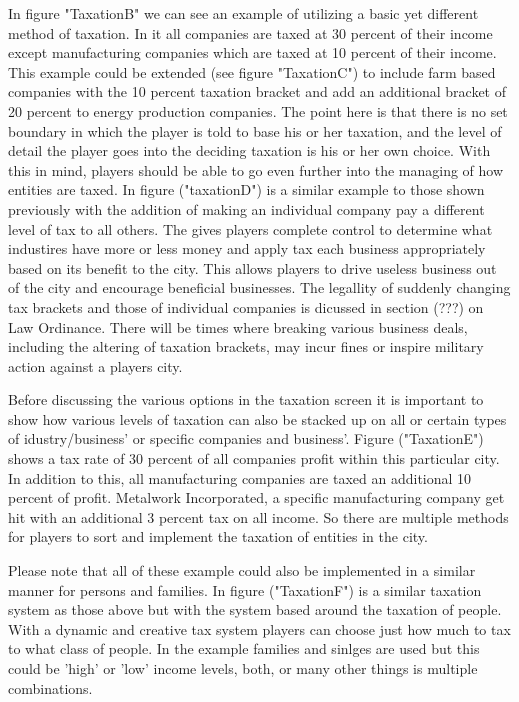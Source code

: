 In figure "TaxationB" we can see an example of utilizing a basic yet different method of taxation. In it all companies are taxed at 30 percent of their income except manufacturing companies which are taxed at 10 percent of their income. This example could be extended (see figure "TaxationC") to include farm based companies with the 10 percent taxation bracket and add an additional bracket of 20 percent to energy production companies. The point here is that there is no set boundary in which the player is told to base his or her taxation, and the level of detail the player goes into the deciding taxation is his or her own choice. With this in mind, players should be able to go even further into the managing of how entities are taxed. 
In figure ("taxationD") is a similar example to those shown previously with the addition of making an individual company pay a different level of tax to all others. The gives players complete control to determine what industires have more or less money and apply tax each business appropriately based on its benefit to the city. This allows players to drive useless business out of the city and encourage beneficial businesses. The legallity of suddenly changing tax brackets and those of individual companies is dicussed in section (???) on Law Ordinance. There will be times where breaking various business deals, including the altering of taxation brackets, may incur fines or inspire military action against a players city.

Before discussing the various options in the taxation screen it is important to show how various levels of taxation can also be stacked up on all or certain types of idustry/business' or specific companies and business'.
Figure ("TaxationE") shows a tax rate of 30 percent of all companies profit within this particular city. In addition to this, all manufacturing companies are taxed an additional 10 percent of profit. Metalwork Incorporated, a specific manufacturing company get hit with an additional 3 percent tax on all income. So there are multiple methods for players to sort and implement the taxation of entities in the city. 

Please note that all of these example could also be implemented in a similar manner for persons and families. In figure ("TaxationF") is a similar taxation system as those above but with the system based around the taxation of people. With a dynamic and creative tax system players can choose just how much to tax to what class of people. In the example families and sinlges are used but this could be 'high' or 'low' income levels, both, or many other things is multiple combinations.



